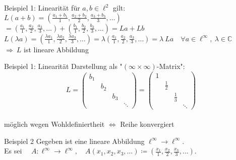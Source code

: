 \documentclass[AERbeamer%
,handout%
,optBeamerClassicFormat%
,optLeftEquations   %
]{AERlatex}
\begin{document}
%
    \begin{frame}{Beispiel 1: Linearität}
        \setlength{\baselineskip}{1.6\baselineskip}
        für $a, b \in \ell^2$ gilt: \\
        $L(a+b)=\left(\frac{a_1+b_1}{1}, \frac{a_2+b_2}{2}, \frac{a_3+b_3}{3}, \ldots\right)$ \\ \pause
        $=\left(\frac{a_1}{1}, \frac{a_2}{2}, \frac{a_3}{3}, \ldots\right)+\left(\frac{b_1}{1}, \frac{b_2}{2}, \frac{b_3}{3}, \ldots\right)=L a+L b$ \\ \pause
        $L(\lambda a)=\left(\frac{\lambda a_1}{1}, \frac{\lambda a_2}{2}, \frac{\lambda a_3}{3}, \ldots\right)=\lambda\left(\frac{a_1}{1}, \frac{a_2}{2}, \frac{a_3}{3}, \ldots\right)=\lambda ~ L a \quad \forall a \in \ell^{\infty}, ~\lambda \in \mathbb{C}$ \\ \pause
        $\Rightarrow ~ L$  ist lineare Abbildung
    \end{frame}
%
    \begin{frame}{Beispiel 1: Linearität}
        Darstellung als "$(\infty \times \infty)$-Matrix":
        \begin{equation*}
            L = \left(\begin{array}{llll}
                          b_1 &     &     &        \\
                          & b_2 &     &        \\
                          &     & b_3 &        \\
                          &     &     & \ddots
            \end{array}\right) =
            \left(\begin{array}{llll}
                      1 &             &             &        \\
                      & \frac{1}{2} &             &        \\
                      &             & \frac{1}{3} &        \\
                      &             &             & \ddots
            \end{array}\right)
        \end{equation*} \\
        möglich wegen Wohldefiniertheit $\Leftrightarrow$ Reihe konvergiert
    \end{frame}
%
    \begin{frame}{Beispiel 2}
        Gegeben ist eine lineare Abbildung $\ell^{\infty} \rightarrow \ell^{\infty}$. \\
        Es sei $\quad A: \ell^{\infty} \rightarrow \ell^{\infty}, \quad A\left(x_1, x_2, x_3, \ldots\right)\coloneqq\left(\frac{x_1}{1}, \frac{x_2}{2}, \frac{x_3}{3}, \ldots\right)$.
    \end{frame}
\end{document}

